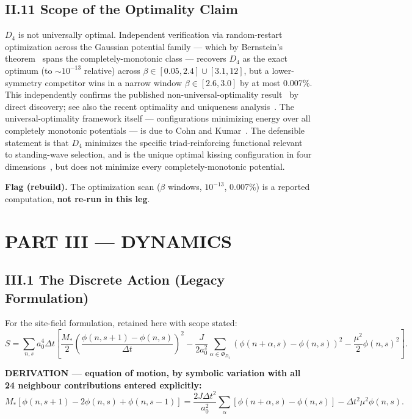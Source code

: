 \documentclass[11pt,a4paper]{article}
\newcommand{\flagbox}[1]{\par\smallskip\noindent\textbf{Flag (rebuild).} #1\par\smallskip}
\begin{document}
\subsection{II.11 Scope of the Optimality Claim}
$D_4$ is not universally optimal. Independent verification via random-restart optimization across the Gaussian potential family --- which by Bernstein's theorem~\cite{bernstein1929} spans the completely-monotonic class --- recovers $D_4$ as the exact optimum (to $\sim 10^{-13}$ relative) across $\beta \in [0.05, 2.4] \cup [3.1, 12]$, but a lower-symmetry competitor wins in a narrow window $\beta \in [2.6, 3.0]$ by at most 0.007\%. This independently confirms the published non-universal-optimality result~\cite{cohn2007} by direct discovery; see also the recent optimality and uniqueness analysis~\cite{delaat2024}. The universal-optimality framework itself --- configurations minimizing energy over all completely monotonic potentials --- is due to Cohn and Kumar~\cite{cohn2007b}. The defensible statement is that $D_4$ minimizes the specific triad-reinforcing functional relevant to standing-wave selection, and is the unique optimal kissing configuration in four dimensions~\cite{musin2008}, but does not minimize every completely-monotonic potential.
\flagbox{The optimization scan ($\beta$ windows, $10^{-13}$, 0.007\%) is a reported computation, \textbf{not re-run in this leg}.}

\section{PART III --- DYNAMICS}

\subsection{III.1 The Discrete Action (Legacy Formulation)}
For the site-field formulation, retained here with scope stated:
\begin{equation}
S = \sum_{n,s} a_0^4 \Delta t \left[ \frac{M_*}{2}\left(\frac{\phi(n,s+1) - \phi(n,s)}{\Delta t}\right)^2 - \frac{J}{2a_0^2}\sum_{\alpha \in \Phi_{D_4}} (\phi(n+\alpha,s) - \phi(n,s))^2 - \frac{\mu^2}{2}\phi(n,s)^2 \right].
\end{equation}

\textbf{DERIVATION --- equation of motion, by symbolic variation with all 24 neighbour contributions entered explicitly:}
\begin{equation}
M_*\left[\phi(n,s+1) - 2\phi(n,s) + \phi(n,s-1)\right] = \frac{2J\Delta t^2}{a_0^2}\sum_{\alpha} \left[\phi(n+\alpha,s) - \phi(n,s)\right] - \Delta t^2\mu^2\phi(n,s).
\end{equation}
\end{document}
